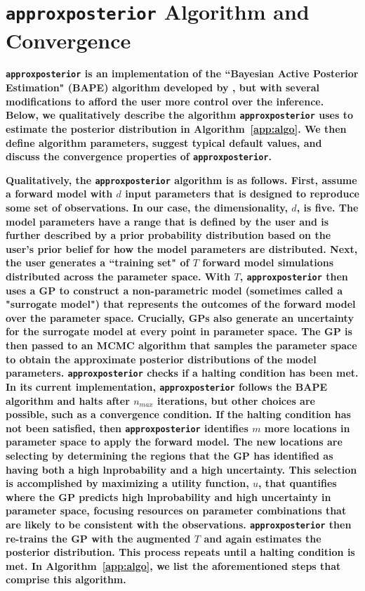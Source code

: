 \documentclass[twocolumn]{aastex62}
\newcommand{\xxx}[1]{{\textbf{#1}}}
\newcommand{\approxposterior}[0]{\texttt{approxposterior}\xspace}
\begin{document}
\appendix

\section{\approxposterior Algorithm and Convergence} \label{sec:app}

\xxx{\approxposterior is an implementation of the ``Bayesian Active Posterior Estimation" (BAPE) algorithm developed by \citet{Kandasamy2017}, but with several modifications to afford the user more control over the inference. Below, we qualitatively describe the algorithm \approxposterior uses to estimate the posterior distribution in Algorithm~\ref{app:algo}. We then define algorithm parameters, suggest typical default values, and discuss the convergence properties of \approxposterior.}

\xxx{Qualitatively, the \approxposterior algorithm is as follows. First, assume a forward model with $d$ input parameters that is designed to reproduce some set of observations. In our case, the dimensionality, $d$, is five. The model parameters have a range that is defined by the user and is further described by a prior probability distribution based on the user's prior belief for how the model parameters are distributed.  Next, the user generates a ``training set" of $T$ forward model simulations distributed across the parameter space. With $T$, \approxposterior then uses a GP to construct a non-parametric model (sometimes called a "surrogate model") that represents the outcomes of the forward model over the parameter space. Crucially, GPs also generate an uncertainty for the surrogate model at every point in parameter space. The GP is then passed to an MCMC algorithm that samples the parameter space to obtain the approximate posterior distributions of the model parameters. \approxposterior checks if a halting condition has been met. In its current implementation, \approxposterior follows the \citet{Kandasamy2017} BAPE algorithm and halts after $n_{max}$ iterations, but other choices are possible, such as a convergence condition. If the halting condition has not been satisfied, then \approxposterior identifies $m$ more locations in parameter space to apply the forward model. The new locations are selecting by determining the regions that the GP has identified as having both a high lnprobability and a high uncertainty. This selection is accomplished by maximizing a utility function, $u$, that quantifies where the GP predicts high lnprobability and high uncertainty in parameter space, focusing resources on parameter combinations that are likely to be consistent with the observations. \approxposterior then re-trains the GP with the augmented $T$ and again estimates the posterior distribution. This process repeats until a halting condition is met. In Algorithm~\ref{app:algo}, we list the aforementioned steps that comprise this algorithm.}
\end{document}
